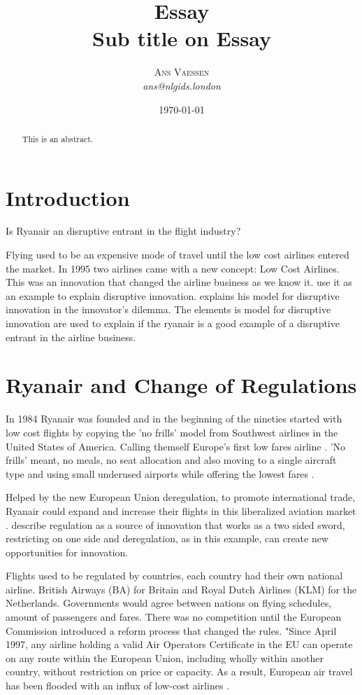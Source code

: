 \documentclass[a4paper, 11pt]{article}
\title{\textbf{Essay}\\Sub title on Essay}
\author{\textsc{Ans Vaessen}
\\{\textit{ans@nlgids.london}}}
\date{\today}
\begin{document}
\maketitle

\begin{abstract}
This is an abstract.
\end{abstract}

\vspace{30pt} %

\section*{Introduction}
Is Ryanair an disruptive entrant in the flight industry?


Flying used to be an expensive mode of travel until the low cost airlines entered the market. In 1995 two airlines came with a new concept: Low Cost Airlines. This was an innovation that changed the airline business as we know it. \cite{TiddBessant} use it as an example to explain disruptive innovation. \citep{Christensen97} explains his model for disruptive innovation in the innovator's dilemma. The elements is model for disruptive innovation are used to explain if the ryanair is a good example of a disruptive entrant in the airline business.

\section{Ryanair and Change of Regulations}

In 1984 Ryanair was founded and in the beginning of the nineties started with low cost flights by copying the 'no frills' model from Southwest airlines in the United States of America. Calling themself Europe’s first low fares airline \cite{Ryanair}. 'No frills' meant, no meals, no seat allocation and also moving to a single aircraft type and using small underused airports while offering the lowest fares \citep{Diaconu}.

Helped by the new European Union deregulation, to promote international trade, Ryanair could expand and increase their flights in this liberalized aviation market \citep{Diaconu}. \cite{TiddBessant} describe regulation as a source of innovation that works as a two sided sword, restricting on one side and deregulation, as in this example, can create new opportunities for innovation.

Flights used to be regulated by countries, each country had their own national airline. British Airways (BA) for Britain and
Royal Dutch Airlines (KLM) for the Netherlands. Governments would agree between nations on flying schedules, amount of
passengers and fares. There was no competition until the European Commission introduced a reform process that changed the
rules. "Since April 1997, any airline holding a valid Air Operators Certificate in the EU can operate on any route within the
European Union, including wholly within another country, without restriction on price or capacity. As a result, European air
travel has been flooded with an influx of low-cost airlines \citep{Eurocontrol2017}.
\end{document}
